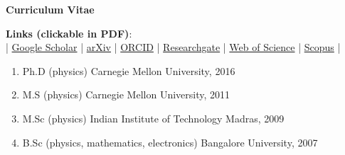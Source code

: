 \documentclass[11pt]{article}
\begin{document}
\begin{center}
	\textbf{Curriculum Vitae}
\end{center}
\begin{minipage}[t]{0.85\textwidth}\vspace{0pt}
    \vspace{0.3cm}
\end{minipage}
\begin{minipage}[t]{0.15\textwidth}\vspace{0pt}
\end{minipage}
\vspace{-0.1cm} 
\begin{center}
    \textbf{Links (clickable in PDF)}: \\ |
    \href{https://scholar.google.com/citations?user=hsYqvQIAAAAJ&hl=en&oi=ao}{Google Scholar} | 
    \href{https://arxiv.org/a/maddali_s_1.html}{arXiv} |
    \href{https://orcid.org/0000-0003-4516-6250}{ORCID} |
    \href{https://www.researchgate.net/profile/Siddharth_Maddali}{Researchgate} |
    \href{https://www.webofscience.com/wos/author/record/1891174}{Web of Science} | 
    \href{https://www.scopus.com/authid/detail.uri?authorId=57045870900}{Scopus} | 
\end{center} 
\begin{enumerate}
    \item Ph.D (physics) \hfill Carnegie Mellon University, 2016
    \item M.S (physics) \hfill Carnegie Mellon University, 2011
    \item M.Sc (physics) \hfill Indian Institute of Technology Madras, 2009
    \item B.Sc (physics, mathematics, electronics) \hfill Bangalore University, 2007
\end{enumerate} 
\end{document}
